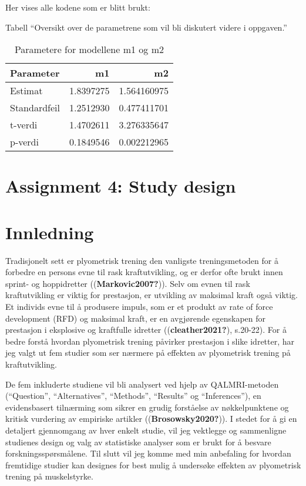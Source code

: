 \documentclass[
  letterpaper,
  DIV=11,
  numbers=noendperiod]{scrreprt}
\begin{document}
Her vises alle kodene som er blitt brukt:

Tabell ``Oversikt over de parametrene som vil bli diskutert videre i
oppgaven.''

\begin{table}
\caption*{
{\large Parametere for modellene m1 og m2}
} 
\fontsize{12.0pt}{14.4pt}\selectfont
\begin{tabular*}{\linewidth}{@{\extracolsep{\fill}}lrr}
\toprule
Parameter & m1 & m2 \\ 
\midrule\addlinespace[2.5pt]
Estimat & 1.8397275 & 1.564160975 \\ 
Standardfeil & 1.2512930 & 0.477411701 \\ 
t-verdi & 1.4702611 & 3.276335647 \\ 
p-verdi & 0.1849546 & 0.002212965 \\ 
\bottomrule
\end{tabular*}
\end{table}


\chapter{Assignment 4: Study design}\label{assignment-4-study-design}


\chapter{Innledning}\label{innledning}

Tradisjonelt sett er plyometrisk trening den vanligste treningsmetoden
for å forbedre en persons evne til rask kraftutvikling, og er derfor
ofte brukt innen sprint- og hoppidretter ((\textbf{Markovic2007?})).
Selv om evnen til rask kraftutvikling er viktig for prestasjon, er
utvikling av maksimal kraft også viktig. Et individs evne til å
produsere impuls, som er et produkt av rate of force development (RFD)
og maksimal kraft, er en avgjørende egenskapen for prestasjon i
eksplosive og kraftfulle idretter ((\textbf{cleather2021?}), s.20-22).
For å bedre forstå hvordan plyometrisk trening påvirker prestasjon i
slike idretter, har jeg valgt ut fem studier som ser nærmere på effekten
av plyometrisk trening på kraftutvikling.

De fem inkluderte studiene vil bli analysert ved hjelp av QALMRI-metoden
(``Question'', ``Alternatives'', ``Methods'', ``Results'' og
``Inferences''), en evidensbasert tilnærming som sikrer en grudig
forståelse av nøkkelpunktene og kritisk vurdering av empiriske artikler
((\textbf{Brosowsky2020?})). I stedet for å gi en detaljert gjennomgang
av hver enkelt studie, vil jeg vektlegge og sammenligne studienes design
og valg av statistiske analyser som er brukt for å besvare
forskningsspørsmålene. Til slutt vil jeg komme med min anbefaling for
hvordan fremtidige studier kan designes for best mulig å undersøke
effekten av plyometrisk trening på muskelstyrke.
\end{document}

